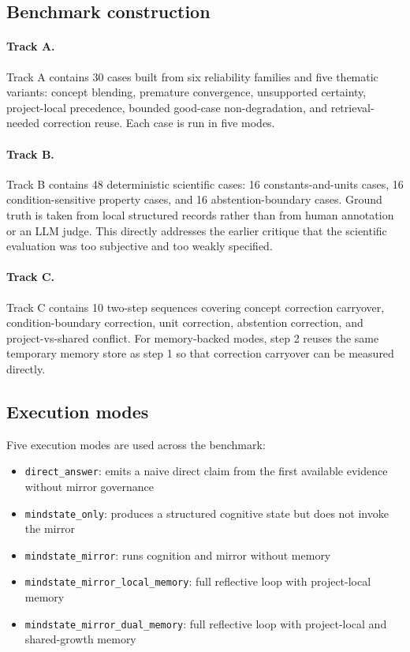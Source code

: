 \documentclass[12pt]{article}
\begin{document}
\subsection{Benchmark construction}

\paragraph{Track A.}
Track A contains 30 cases built from six reliability families and five thematic variants: concept blending, premature convergence, unsupported certainty, project-local precedence, bounded good-case non-degradation, and retrieval-needed correction reuse. Each case is run in five modes.

\paragraph{Track B.}
Track B contains 48 deterministic scientific cases: 16 constants-and-units cases, 16 condition-sensitive property cases, and 16 abstention-boundary cases. Ground truth is taken from local structured records rather than from human annotation or an LLM judge. This directly addresses the earlier critique that the scientific evaluation was too subjective and too weakly specified.

\paragraph{Track C.}
Track C contains 10 two-step sequences covering concept correction carryover, condition-boundary correction, unit correction, abstention correction, and project-vs-shared conflict. For memory-backed modes, step 2 reuses the same temporary memory store as step 1 so that correction carryover can be measured directly.

\subsection{Execution modes}

Five execution modes are used across the benchmark:
\begin{itemize}
\item \texttt{direct\_answer}: emits a naive direct claim from the first available evidence without mirror governance
\item \texttt{mindstate\_only}: produces a structured cognitive state but does not invoke the mirror
\item \texttt{mindstate\_mirror}: runs cognition and mirror without memory
\item \texttt{mindstate\_mirror\_local\_memory}: full reflective loop with project-local memory
\item \texttt{mindstate\_mirror\_dual\_memory}: full reflective loop with project-local and shared-growth memory
\end{itemize}
\end{document}
